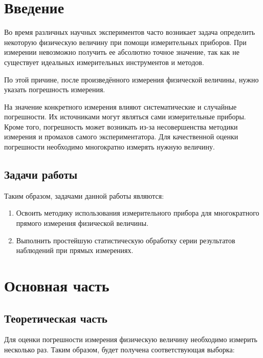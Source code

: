 

\section{Введение}
Во время различных научных экспериментов часто возникает задача определить некоторую физическую величину при помощи измерительных приборов. При измерении  невозможно получить ее абсолютно точное значение, так как не существует идеальных измерительных инструментов и методов.

По этой причине, после произведённого измерения физической величины, нужно указать погрешность измерения.

На значение конкретного измерения влияют систематические и случайные погрешности. Их источниками могут являться сами измерительные приборы. Кроме того, погрешность может возникать из-за несовершенства методики измерения и промахов самого экспериментатора. 
Для качественной оценки погрешности необходимо многократно измерять нужную величину.


\subsection{Задачи работы}

Таким образом, задачами данной работы являются:
\begin{enumerate}
    \item Освоить методику использования измерительного прибора для
многократного прямого измерения физической величины.
    \item Выполнить простейшую статистическую обработку серии
результатов наблюдений при прямых измерениях.

\end{enumerate}




\section{Основная часть}

\subsection{Теоретическая часть}
Для оценки погрешности измерения физическую величину необходимо измерить несколько раз. Таким образом, будет получена соответствующая выборка:


